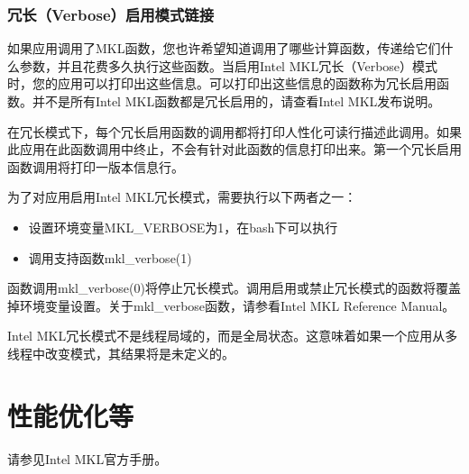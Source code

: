 \documentclass[a4paper,12pt,english]{sphinxmanual}
\begin{document}
\subsubsection{冗长（Verbose）启用模式链接}
\label{\detokenize{intel-mkl/intel-mkl:verbose}}
\sphinxAtStartPar
如果应用调用了MKL函数，您也许希望知道调用了哪些计算函数，传递给它们什么参数，并且花费多久执行这些函数。当启用Intel MKL冗长（Verbose）模式时，您的应用可以打印出这些信息。可以打印出这些信息的函数称为冗长启用函数。并不是所有Intel MKL函数都是冗长启用的，请查看Intel MKL发布说明。

\sphinxAtStartPar
在冗长模式下，每个冗长启用函数的调用都将打印人性化可读行描述此调用。如果此应用在此函数调用中终止，不会有针对此函数的信息打印出来。第一个冗长启用函数调用将打印一版本信息行。

\sphinxAtStartPar
为了对应用启用Intel MKL冗长模式，需要执行以下两者之一：
\begin{itemize}
\item {} 
\sphinxAtStartPar
设置环境变量MKL\_VERBOSE为1，在bash下可以执行

\item {} 
\sphinxAtStartPar
调用支持函数mkl\_verbose(1)

\end{itemize}

\sphinxAtStartPar
函数调用mkl\_verbose(0)将停止冗长模式。调用启用或禁止冗长模式的函数将覆盖掉环境变量设置。关于mkl\_verbose函数，请参看Intel MKL Reference Manual。

\sphinxAtStartPar
Intel MKL冗长模式不是线程局域的，而是全局状态。这意味着如果一个应用从多线程中改变模式，其结果将是未定义的。


\section{性能优化等}
\label{\detokenize{intel-mkl/intel-mkl:id20}}
\sphinxAtStartPar
请参见Intel MKL官方手册。

\sphinxstepscope
\end{document}

